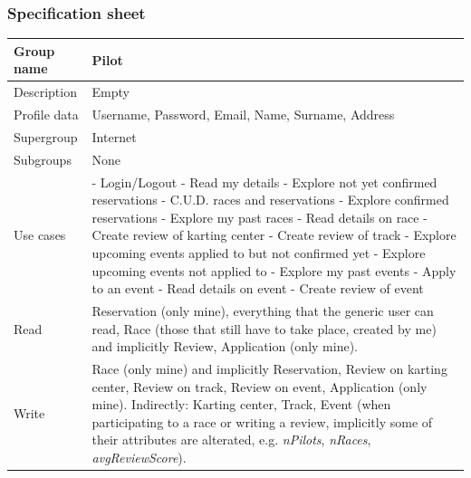 \documentclass{beamer}
\begin{document}
\begin{frame}
    \frametitle{Specification sheet}
    \begin{table}
        \tiny
        \begin{tabular}{|p{2cm}|p{6cm}|}
        \hline
        Group name & \textbf{Pilot} \\
        \hline
        Description & Empty \\
        \hline
        Profile data & Username, Password, Email, Name, Surname, Address \\
        Supergroup & Internet \\
        \hline
        Subgroups & None \\
        \hline
        Use cases &
        - Login/Logout \newline
        - Read my details \newline
        - Explore not yet confirmed reservations \newline
        - C.U.D. races and reservations
        - Explore confirmed reservations \newline
        - Explore my past races \newline
        - Read details on race \newline
        - Create review of karting center \newline
        - Create review of track \newline
        - Explore upcoming events applied to but not confirmed yet \newline
        - Explore upcoming events not applied to \newline
        - Explore my past events \newline
        - Apply to an event \newline
        - Read details on event \newline
        - Create review of event \\
        \hline
        Read & Reservation (only mine), everything that the generic user can read,
        Race (those that still have to take place, created by me) and implicitly Review,
        Application (only mine). \\
        Write & Race (only mine) and implicitly Reservation, Review on karting center, 
        Review on track, Review on event, Application (only mine). \newline
        Indirectly: Karting center, Track, Event (when participating to a race or writing a review, implicitly some of their 
        attributes are alterated, e.g. \textit{nPilots}, \textit{nRaces}, \textit{avgReviewScore}). \\
        \hline
        \end{tabular}
    \end{table}
\end{frame}
\end{document}
